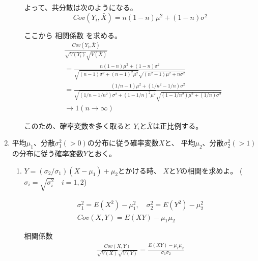 \documentclass[12pt,b5paper]{ltjsarticle}
\begin{document}
\begin{enumerate}
\begin{enumerate}
            よって、共分散は次のようになる。
            \begin{equation}
             Cov(Y_{i},\bar{X}) = n(1-n)\mu^{2}+(1-n)\sigma^{2}
            \end{equation}

            ここから
            相関係数
            を求める。
            \begin{align}
             & \frac{Cov(Y_{i},\bar{X})}{\sqrt{V(Y_{i})}\sqrt{V(\bar{X})}}\\
             &=
             \frac{n(1-n)\mu^{2}+(1-n)\sigma^{2}}{\sqrt{(n-1)\sigma^{2} + (n-1)^{2}\mu^{2}}\sqrt{(n^{2}-1)\mu^{2}+n\sigma^{2}}}\\
             &= \frac{(1/n-1)\mu^{2}+(1/n^{2}-1/n)\sigma^{2}}{\sqrt{(1/n-1/n^{2})\sigma^{2} + (1-1/n)^{2}\mu^{2}}\sqrt{(1-1/n^{2})\mu^{2}+(1/n)\sigma^{2}}}\\
             & \rightarrow 1 (n\rightarrow \infty)
            \end{align}

            このため、確率変数を多く取ると
            $Y_{i}$と$\bar{X}$は正比例する。


            \hrulefill

      \end{enumerate}


 \item
      平均$\mu_{1}$、分散$\sigma_{1}^{2} (>0)$の分布に従う確率変数$X$と、
      平均$\mu_{2}$、分散$\sigma_{2}^{2} (>1)$の分布に従う確率変数$Y$とおく。
      \begin{enumerate}
       \item
            $Y=(\sigma_{2}/\sigma_{1})(X-\mu_{1})+\mu_{2}$とかける時、
            $X$と$Y$の相関を求めよ。
            ($\sigma_{i}=\sqrt{\sigma_{i}^{2}} \quad i=1,2$)

            \dotfill

            \begin{gather}
             \sigma_{1}^{2} = E(X^{2})-\mu_{1}^{2},\quad
             \sigma_{2}^{2} = E(Y^{2})-\mu_{2}^{2}\\
             Cov(X,Y) = E(XY) - \mu_{1}\mu_{2}
            \end{gather}

            相関係数
            \begin{align}
             \frac{Cov(X,Y)}{\sqrt{V(X)}\sqrt{V(Y)}}
             = \frac{ E(XY) - \mu_{1}\mu_{2} }{ \sigma_{1} \sigma_{2} }
            \end{align}


\end{enumerate}
\end{enumerate}
\end{document}
